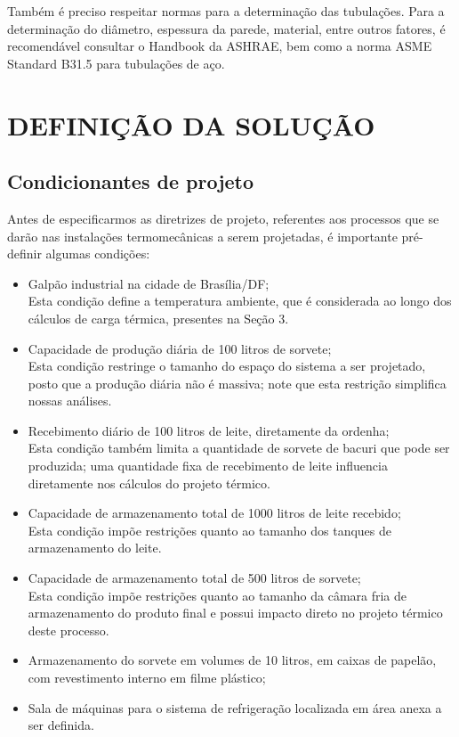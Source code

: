 \documentclass[10pt,a4paper]{article}
\begin{document}
Também é preciso respeitar normas para a determinação das tubulações. Para a determinação do diâmetro, espessura da parede, material, entre outros fatores, é recomendável consultar o Handbook da ASHRAE, bem como a norma ASME Standard B31.5 para tubulações de aço.

\newpage


\section{{ DEFINIÇÃO DA SOLUÇÃO}}

\subsection{{ Condicionantes de projeto}}
Antes de especificarmos as diretrizes de projeto, referentes aos processos que se darão nas instalações termomecânicas a serem projetadas, é importante pré-definir algumas condições:

\begin{itemize}
    \item Galpão industrial na cidade de Brasília/DF; \\
          Esta condição define a temperatura ambiente, que é considerada ao longo dos cálculos de carga térmica, presentes na Seção 3.
    \item Capacidade de produção diária de 100 litros de sorvete; \\
          Esta condição restringe o tamanho do espaço do sistema a ser projetado, posto que a produção diária não é massiva; note que esta restrição simplifica nossas análises.
    \item Recebimento diário de 100 litros de leite, diretamente da ordenha; \\
          Esta condição também limita a quantidade de sorvete de bacuri que pode ser produzida; uma quantidade fixa de recebimento de leite influencia diretamente nos cálculos do projeto térmico.
    \item Capacidade de armazenamento total de 1000 litros de leite recebido; \\
          Esta condição impõe restrições quanto ao tamanho dos tanques de armazenamento do leite. 
    \item Capacidade de armazenamento total de 500 litros de sorvete; \\
          Esta condição impõe restrições quanto ao tamanho da câmara fria de armazenamento do produto final e possui impacto direto no projeto térmico deste processo.
    \item Armazenamento do sorvete em volumes de 10 litros, em caixas de papelão, com revestimento interno em filme plástico; 
    \item Sala de máquinas para o sistema de refrigeração localizada em área anexa a ser definida.
\end{itemize}
\end{document}
